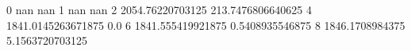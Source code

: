 0 nan nan
1 nan nan
2 2054.76220703125 213.7476806640625
4 1841.0145263671875 0.0
6 1841.555419921875 0.5408935546875
8 1846.1708984375 5.1563720703125
